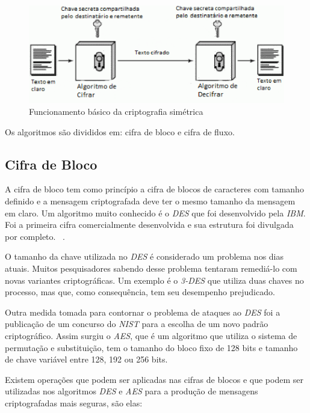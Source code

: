 \begin{figure}[h]
\centering
\includegraphics[scale=0.9]
{figuras/SymmetricCipher.eps}
\caption[Funcionamento básico da criptografia simétrica] {Funcionamento básico da criptografia simétrica\protect\footnotemark}
\end{figure}

Os algoritmos são divididos em: cifra de bloco e cifra de fluxo.

\subsection{Cifra de Bloco}
\label{block-cipher}

A cifra de bloco tem como princípio a cifra de blocos de caracteres com tamanho definido e a mensagem criptografada deve ter o mesmo tamanho da mensagem em claro. Um algoritmo muito conhecido é o \textit{DES} que foi desenvolvido pela \textit{IBM}. Foi a primeira cifra comercialmente desenvolvida e sua estrutura foi divulgada por completo. ~\cite{alex-biryukov}. 

O tamanho da chave utilizada no \textit{DES} é considerado um problema nos dias atuais. Muitos pesquisadores sabendo desse problema tentaram remediá-lo com novas variantes criptográficas. Um exemplo é o \textit{3-DES} que utiliza duas chaves no processo, mas que, como consequência, tem seu desempenho prejudicado. 

Outra medida tomada para contornar o problema de ataques ao \textit{DES} foi a publicação de um concurso do \textit{NIST} para a escolha de um novo padrão criptográfico. Assim surgiu o \textit{AES}, que é um algoritmo que utiliza o sistema de permutação e substituição, tem o tamanho do bloco fixo de 128 bits e tamanho de chave variável entre 128, 192 ou 256 bits. 

Existem operações que podem ser aplicadas nas cifras de blocos e que podem ser utilizadas nos algoritmos \textit{DES} e \textit{AES} para a produção de mensagens criptografadas mais seguras, são elas:

